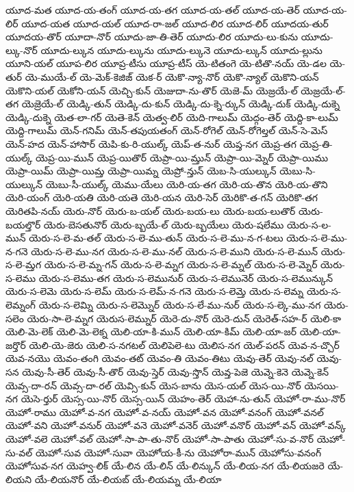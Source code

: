 {యూద-మత
యూద-య-తంగ్
యూద-య-తగ
యూద-య-తల్
యూద-య-తెర్
యూద-య-లిర్
యూద-యత
యూద-యల్
యూద-రా-జల్
యూద-లిర
యూద-లిర్
యూదయ-తుర్
యూదయ-తొర్
యూదా-నొర్
యూదు-జా-తి-తెర్
యూదు-లిర
యూదు-లు-కును
యూదు-ల్కు-నొర్
యూదు-ల్కున
యూదు-ల్కును
యూదు-ల్కునె
యూదు-ల్కున్
యూదు-ల్లును
యూని-యల్
యూప-లిర
యూప్ర-టీసు
యూప్ర-టీస్
యె-టితంగె
యె-టితొ-నయ్
యె-డల
యె-తుర్
యె-ముయే-ల్
యె-మెక్-కెజిజ్
యెక-ర్
యెకొ-న్యా-నొర్
యెకొ-న్యాల్
యెకొని-యన్
యెకొని-యల్
యెకోని-యన్
యెచ్చి-కున్
యెజుదా-ను-తొర్
యెజె-మ్
యెజ్రయే-ల్
యెజ్రయే-ల్-తగ
యెజ్రెయే-ల్
యెడ్కి-తున్
యెడ్కి-దు-కున్
యెడ్కి-దు-క్నె-ర్కున్
యెడ్కి-దుక్
యెడ్కి-దుక్నె
యెడ్కి-దుక్నె
యెత-లా-గర్
యెతె-కెన్
యెత్వ-లిర్
యెది-గాలుమ్
యెద్గం-తెర్
యెద్ది-కా-లుమ్
యెద్ది-గాలుమ్
యెన్-గనిమ్
యెన్-తపుయతంగ్
యెన్-రోగెల్
యెన్-రోగెల్తల్
యెన్-సె-మెస్
యెన్-హద
యెన్-హాసొర్
యెపి-కు-రి-యుల్క్
యెప్-త-నుర్
యెప్త-నగ
యెప్ర-తగ
యెప్ర-తి-యుల్క్
యెప్ర-యి-మున్
యెప్ర-యితొర్
యెప్రా-యి-మ్తున్
యెప్రా-యి-మ్నెర్
యెప్రా-యిము
యెప్రా-యిమ్
యెప్రా-యిమ్త
యెప్రా-యిమ్న
యెప్రో-న్తున్
యెబ-సి-యుల్కున్
యెబు-సి-యుల్కున్
యెబు-సీ-యుల్క్
యెము-యేలు
యెరి-య-తగ
యెరి-య-తొన
యెరి-య-తొని
యెరి-యంగ్
యెరి-యతి
యెరి-యతె
యెరి-యన
యెరి-సెర్
యెరికొ-త-గన్
యెరికొ-తగ
యెరితపి-నయ్
యెరు-నొర్
యెరు-బ-యల్
యెరు-బయ-లు
యెరు-బయ-లుతొర్
యెరు-బయల్తొర్
యెరు-బెసతునొర్
యెరు-బ్బయే-ల్
యెరు-బ్బయేలు
యెరు-షలేము
యెరు-స-ల-మున్
యెరు-స-లె-మ-తల్
యెరు-స-లె-ము-తున్
యెరు-స-లె-ము-న-గ-టలు
యెరు-స-లె-ము-న-గనె
యెరు-స-లె-ము-నగ
యెరు-స-లె-ము-నల్
యెరు-స-లె-ముని
యెరు-స-లె-మున్
యెరు-స-లె-మ్తగ
యెరు-స-లె-మ్న-గన్
యెరు-స-లె-మ్నగ
యెరు-స-లె-మ్నల్
యెరు-స-లె-మ్నెర్
యెరు-స-లెము
యెరు-స-లెము-తగ
యెరు-స-లెమునుర్
యెరు-స-లెమునెర్
యెరు-స-లెమున్కున్
యెరు-స-లెమె
యెరు-స-లెమ్
యెరు-స-లెమ్-న-గనె
యెరు-స-లెమ్తె
యెరు-స-లెమ్న
యెరు-స-లెమ్నంగ్
యెరు-స-లెమ్ని
యెరు-స-లెమ్నొర్
యెరు-స-లే-ము-నుర్
యెరు-స-ల్కె-ము-నగ
యెరు-సలెం
యెరు-సా-లె-మ్నగ
యెరుస-లెమ్నుర్
యెరె-దు-నొర్
యెరె-దున్
యెరెత్-సహ-ర్
యెలి-కా
యెలి-మె-లెక్
యెలి-మె-లెక్న
యెలి-యా-కి-మున్
యెలి-యా-కిమ్
యెలి-యా-జర్
యెలి-యా-జర్తొర్
యెలి-యె-జెరు
యెలి-స-నగటల్
యెలిపెలె-టు
యెలిస-నగ
యెల్-పరన్
యెవ-న-చ్చొర్
యెవ-నయొ
యెవం-తంగి
యెవం-తట్
యెవం-తి
యెవం-తిటు
యెవు-తెర్
యెవు-నల్
యెవు-సన
యెవు-సీ-తెర్
యెవు-సీ-తొర్
యెవు-స్తెర్
యెవు-స్తొన్
యెవ్త-పెజె
యెవ్నె-కెనె
యెవ్నె-కెన్
యెవ్స-దా-రన్
యెవ్స-దా-రల్
యెవ్సి-కున్
యెస-బాను
యెస-యల్
యెస-యి-నొర్
యెసయి-నగ
యెసె-ర్తుర్
యెస్స-యి-నొర్
యెస్స-యిన్
యెహం-తెర్
యెహా-ను-తున్
యెహో-రా-ము-నొర్
యెహో-రాము
యెహో-వ-నగ
యెహో-వ-నయ్
యెహో-వన
యెహో-వనంగ్
యెహో-వనల్
యెహో-వని
యెహో-వనుర్
యెహో-వనె
యెహో-వనెర్
యెహో-వనొర్
యెహో-వన్
యెహో-వన్క్
యెహో-వలె
యెహో-వల్
యెహో-సా-పా-తు-నొర్
యెహో-సా-పాతు
యెహో-సు-వ-నొర్
యెహో-సు-వల్
యెహో-సువ
యెహో-సువా
యెహోయ-కీ-ను
యెహోరా-మున్
యెహోసు-వనంగ్
యెహోసువ-నగ
యెహ్వ-లిక్
యే-లిన
యే-లిన్
యే-లిన్కున్
యే-లియ-నగ
యే-లియజరె
యే-లియని
యే-లియనొర్
యే-లియబ్
యే-లియమ్న
యే-లియా
}
